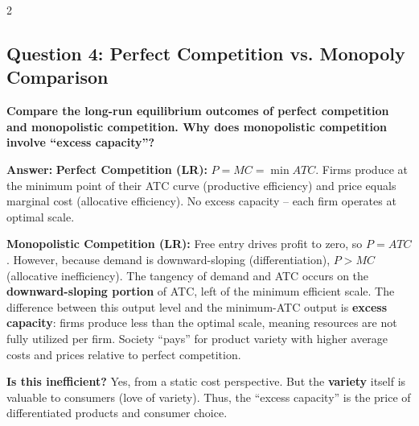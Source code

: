 \documentclass[10pt,a4paper]{article}
\begin{document}
\begin{multicols}{2}
\vspace{0.2cm}

\subsection*{Question 4: Perfect Competition vs. Monopoly Comparison}
\textbf{Compare the long-run equilibrium outcomes of perfect competition and monopolistic competition. Why does monopolistic competition involve ``excess capacity''?}

\vspace{0.05cm}
\textbf{Answer:}
\textbf{Perfect Competition (LR):} $P = MC = \min ATC$. Firms produce at the minimum point of their ATC curve (productive efficiency) and price equals marginal cost (allocative efficiency). No excess capacity -- each firm operates at optimal scale.

\textbf{Monopolistic Competition (LR):} Free entry drives profit to zero, so $P = ATC$. However, because demand is downward-sloping (differentiation), $P > MC$ (allocative inefficiency). The tangency of demand and ATC occurs on the \textbf{downward-sloping portion} of ATC, left of the minimum efficient scale. The difference between this output level and the minimum-ATC output is \textbf{excess capacity}: firms produce less than the optimal scale, meaning resources are not fully utilized per firm. Society ``pays'' for product variety with higher average costs and prices relative to perfect competition.

\textbf{Is this inefficient?} Yes, from a static cost perspective. But the \textbf{variety} itself is valuable to consumers (love of variety). Thus, the ``excess capacity'' is the price of differentiated products and consumer choice.

\end{multicols}
\end{document}

